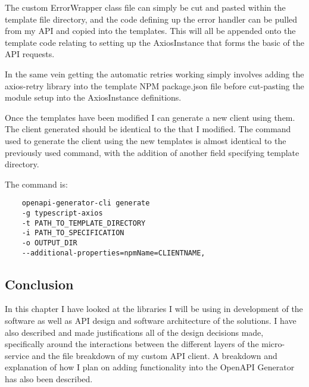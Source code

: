 The custom ErrorWrapper class file can simply be cut and pasted within the template file directory, and the code defining up the error handler can be pulled from my API and copied into the templates. This will all be appended onto the template code relating to setting up the AxiosInstance that forms the basic of the API requests.

In the same vein getting the automatic retries working simply involves adding the axios-retry library into the template NPM package.json file  before cut-pasting the module setup into the AxiosInstance definitions.

Once the templates have been modified I can generate a new client using them. The client generated should be identical to the that I modified. The command used to generate the client using the new templates is almost identical to the previously used command, with the addition of another field specifying template directory.

The command is:
\begin{verbatim}
    openapi-generator-cli generate 
    -g typescript-axios
    -t PATH_TO_TEMPLATE_DIRECTORY
    -i PATH_TO_SPECIFICATION
    -o OUTPUT_DIR
    --additional-properties=npmName=CLIENTNAME,
\end{verbatim}
\subsection{Conclusion}
In this chapter I have looked at the libraries I will be using in development of the software as well as API design and software architecture of the solutions. I have also described and made justifications all of the design decisions made, specifically around the interactions between the different layers of the micro-service and the file breakdown of my custom API client. A breakdown and explanation of how I plan on adding functionality into the OpenAPI Generator has also been described.